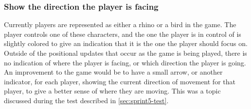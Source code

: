 \subsubsection{Show the direction the player is facing}
Currently players are represented as either a rhino or a bird in the game.
The player controls one of these characters, and the one the player is in control of is slightly colored to give an indication that it is the one the player should focus on.
Outside of the positional updates that occur as the game is being played, there is no indication of where the player is facing, or which direction the player is going.
An improvement to the game would be to have a small arrow, or another indicator, for each player, showing the current direction of movement for that player, to give a better sense of where they are moving.
This was a topic discussed during the test described in \autoref{sec:sprint5-test}.

